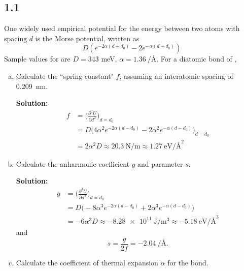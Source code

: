 \documentclass[12pt]{article}
\begin{document}
\subsection{1.1}
One widely used empirical potential for the energy between two atoms with
spacing $d$ is the Morse potential, written as
\begin{equation}
	D(e^{-2\alpha(d - d_0)} - 2e^{-\alpha (d - d_0)})
\end{equation}
Sample values for  are $D = 343$ meV, $\alpha = \SI{1.36}{\per\angstrom}$.
For a diatomic bond of ,
\begin{enumerate}[(a)]
	\item Calculate the ``spring constant" $f$, assuming an interatomic spacing of \SI{0.209}{\nano\meter}.

	      \textbf{Solution:}
	      \begin{equation}
		      \begin{split}
			      f &= \Big( \frac{ \partial^2 U }{ \partial d^2 } \Big)_{ d = d_0 } \\
			      &= D \Big( 4 \alpha^2 e^{-2\alpha(d - d_0)} - 2 \alpha^2 e^{-\alpha(d - d_0)} \Big)_{ d = d_0 } \\
			      &= 2 \alpha^2 D \approx \SI{20.3}{\newton\per\meter} \approx \SI{1.27}{\electronvolt\per\square\angstrom}
		      \end{split}
	      \end{equation}

	\item Calculate the anharmonic coefficient $g$ and parameter $s$.

	      \textbf{Solution:}
	      \begin{equation}
		      \begin{split}
			      g &= \Big( \frac{ \partial^3 U }{ \partial d^3 } \Big)_{ d = d_0 } \\
			      &= D \Big( -8 \alpha^3 e^{-2\alpha(d - d_0)} + 2 \alpha^3 e^{-\alpha(d - d_0)} \Big) \\
			      &= -6 \alpha^3 D \approx \SI{-8.28e11}{\joule\per\cubic\meter} \approx \SI{-5.18}{\electronvolt\per\cubic\angstrom}
		      \end{split}
	      \end{equation}
	      and \begin{equation}
		      s = \frac{g}{2 f} = \SI{-2.04}{\per\angstrom}.
	      \end{equation}

	\item Calculate the coefficient of thermal expansion $\alpha$ for the bond.


\end{enumerate}
\end{document}
